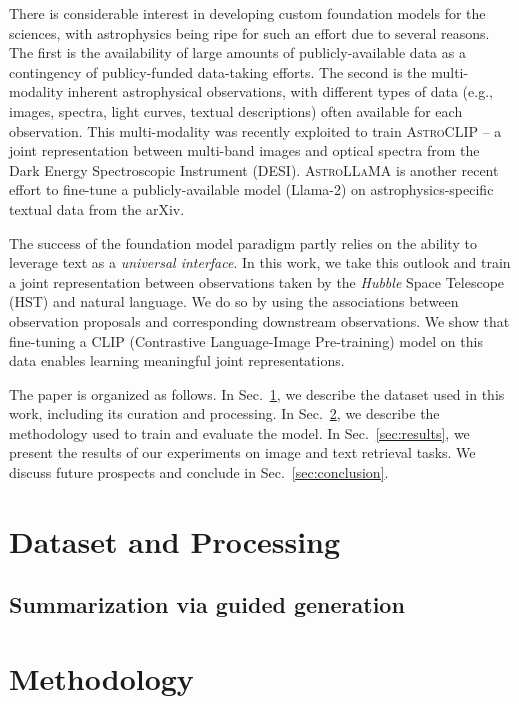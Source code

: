\documentclass[10pt]{article} %
\begin{document}
There is considerable interest in developing custom foundation models for the sciences, with astrophysics being ripe for such an effort due to several reasons. The first is the availability of large amounts of publicly-available data as a contingency of publicy-funded data-taking efforts. The second is the multi-modality inherent astrophysical observations, with different types of data (e.g., images, spectra, light curves, textual descriptions) often available for each observation. This multi-modality was recently exploited to train \textsc{AstroCLIP} -- a joint representation between multi-band images and optical spectra from the Dark Energy Spectroscopic Instrument (DESI). \textsc{AstroLLaMA} is another recent effort to fine-tune a publicly-available model (Llama-2) on astrophysics-specific textual data from the arXiv.

The success of the foundation model paradigm partly relies on the ability to leverage text as a \emph{universal interface}. In this work, we take this outlook and train a joint representation between observations taken by the \emph{Hubble} Space Telescope (HST) and natural language. We do so by using the associations between observation proposals and corresponding downstream observations. We show that fine-tuning a CLIP (Contrastive Language-Image Pre-training) model on this data enables learning meaningful joint representations.

The paper is organized as follows. In Sec.~\ref{sec:dataset}, we describe the dataset used in this work, including its curation and processing. In Sec.~\ref{sec:methodology}, we describe the methodology used to train and evaluate the model. In Sec.~\ref{sec:results}, we present the results of our experiments on image and text retrieval tasks. We discuss future prospects and conclude in Sec.~\ref{sec:conclusion}.

\section{Dataset and Processing}
\label{sec:dataset}

\subsection{Summarization via guided generation}
\label{sec:summarization}

\section{Methodology}
\label{sec:methodology}
\end{document}
